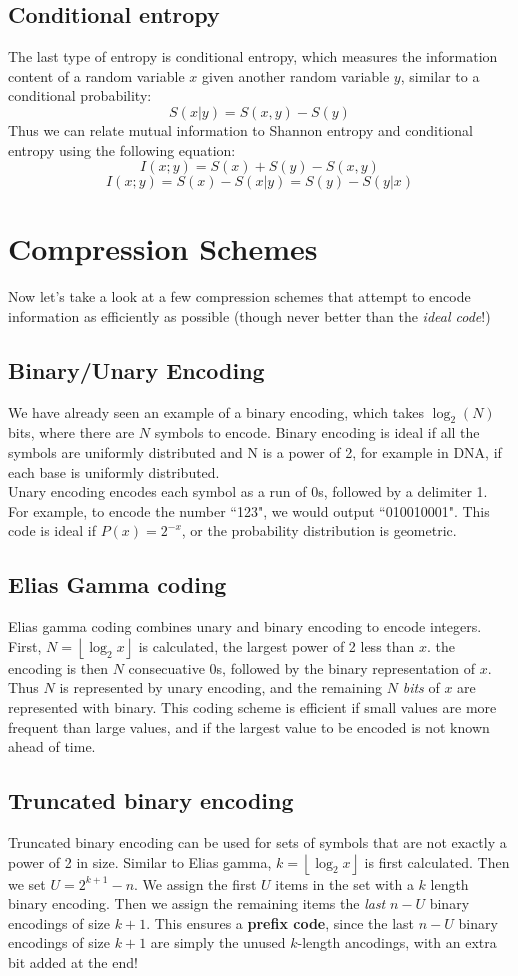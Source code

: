 \documentclass[12pt]{article}
\begin{document}
\subsection{Conditional entropy}
The last type of entropy is conditional entropy, which measures the information content of a random variable $x$ given another random variable $y$, similar to a conditional probability:
$$S(x|y) = S(x,y) - S(y)$$
Thus we can relate mutual information to Shannon entropy and conditional entropy using the following equation:
$$I(x;y) = S(x) + S(y) - S(x,y)$$
$$I(x;y) = S(x) - S(x|y) = S(y) - S(y|x)$$

\section{Compression Schemes}
Now let's take a look at a few compression schemes that attempt to encode information as efficiently as possible (though never better than the \textit{ideal code}!)
\subsection{Binary/Unary Encoding}
We have already seen an example of a binary encoding, which takes $\log_2(N)$ bits, where there are $N$ symbols to encode. Binary encoding is ideal if all the symbols are uniformly distributed and N is a power of 2, for example in DNA, if each base is uniformly distributed.\\[10pt]
Unary encoding encodes each symbol as a run of 0s, followed by a delimiter 1. For example, to encode the number ``123", we would output ``010010001". This code is ideal if $P(x) = 2^{-x}$, or the probability distribution is geometric.
\subsection{Elias Gamma coding}
Elias gamma coding combines unary and binary encoding to encode integers. First, $N = \left \lfloor{\log_2x}\right \rfloor $ is calculated, the largest power of 2 less than $x$. the encoding is then $N$ consecuative 0s, followed by the binary representation of $x$. Thus $N$ is represented by unary encoding, and the remaining $N$ \textit{bits} of $x$ are represented with binary. This coding scheme is efficient if small values are more frequent than large values, and if the largest value to be encoded is not known ahead of time.
\subsection{Truncated binary encoding}
Truncated binary encoding can be used for sets of symbols that are not exactly a power of 2 in size. Similar to Elias gamma, $k = \left \lfloor{\log_2x}\right \rfloor $ is first calculated. Then we set $U = 2^{k + 1} - n$. We assign the first $U$ items in the set with a $k$ length binary encoding. Then we assign the remaining items the \textit{last} $n-U$ binary encodings of size $k+1$. This ensures a \textbf{prefix code}, since the last $n-U$ binary encodings of size $k+1$ are simply the unused $k$-length ancodings, with an extra bit added at the end!
\end{document}
